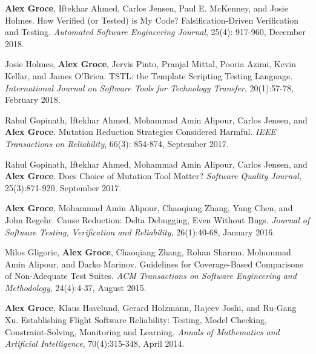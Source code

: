 \documentclass[ComputerScience]{vita}
\begin{document}
\begin{vita}
\begin{Books, Edited Volumes}
\end{Books, Edited Volumes}

\begin{Refereed Journal Publications}
\item
{\bf Alex Groce}, Iftekhar Ahmed, Carlos Jensen, Paul E. McKenney, and
Josie Holmes.
\newblock How Verified (or Tested) is My Code? Falsification-Driven Verification and Testing.
\newblock \emph{Automated Software Engineering Journal}, 25(4):
917-960, December 2018.

\item
Josie Holmes, {\bf Alex Groce}, Jervis Pinto, Pranjal Mittal, Pooria Azimi, Kevin Kellar, and James O'Brien.
\newblock TSTL: the Template Scripting Testing Language.
\newblock \emph{International Journal on Software Tools for Technology Transfer}, 20(1):57-78, February 2018.


\item
Rahul Gopinath, Iftekhar Ahmed, Mohammad Amin Alipour, Carlos Jensen, and {\bf Alex Groce}.
\newblock Mutation Reduction Strategies Considered Harmful.
\newblock \emph{IEEE Transactions on Reliability}, 66(3): 854-874, September 2017.


\item
Rahul Gopinath, Iftekhar Ahmed, Mohammad Amin Alipour, Carlos Jensen, and {\bf Alex Groce}.
\newblock Does Choice of Mutation Tool Matter?
\newblock \emph{Software Quality Journal}, 25(3):871-920, September 2017.

\item
{\bf Alex Groce}, Mohammad Amin Alipour, Chaoqiang Zhang, Yang Chen, and John Regehr.
\newblock Cause Reduction: Delta Debugging, Even Without Bugs.
\newblock \emph{Journal of Software Testing, Verification and Reliability}, 26(1):40-68, January 2016.

\item
Milos Gligoric, {\bf Alex Groce}, Chaoqiang Zhang, Rohan Sharma, Mohammad Amin Alipour, and Darko Marinov.
\newblock Guidelines for Coverage-Based Comparisons of Non-Adequate Test Suites.
\newblock \emph{ACM Transactions on Software Engineering and Methodology}, 24(4):4-37, August 2015.

\item
{\bf Alex Groce}, Klaus Havelund, Gerard Holzmann, Rajeev Joshi, and Ru-Gang Xu.
\newblock Establishing Flight Software Reliability: Testing, Model Checking, Constraint-Solving, Monitoring and Learning.
\newblock \emph{Annals of Mathematics and Artificial Intelligence}, 70(4):315-348, April 2014.


\end{Refereed Journal Publications}
\end{vita}
\end{document}
